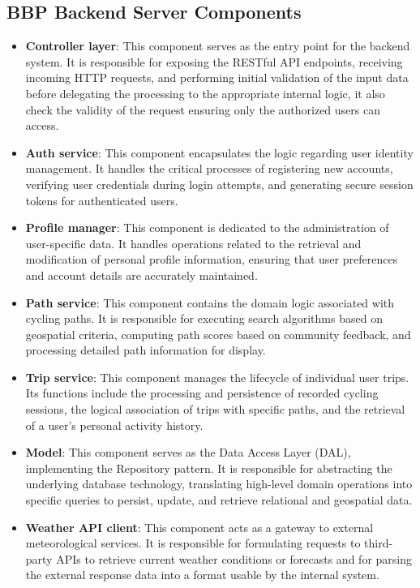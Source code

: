 \subsection{BBP Backend Server Components}

\begin{itemize}
    \item \textbf{Controller layer}: This component serves as the entry point for the backend system. It is responsible for exposing the RESTful API endpoints, receiving incoming HTTP requests, and performing initial validation of the input data before delegating the processing to the appropriate internal logic, it also check the validity of the request ensuring only the authorized users can access.


    \item \textbf{Auth service}: This component encapsulates the logic regarding user identity management. It handles the critical processes of registering new accounts, verifying user credentials during login attempts, and generating secure session tokens for authenticated users.

    \item \textbf{Profile manager}: This component is dedicated to the administration of user-specific data. It handles operations related to the retrieval and modification of personal profile information, ensuring that user preferences and account details are accurately maintained.

    \item \textbf{Path service}: This component contains the domain logic associated with cycling paths. It is responsible for executing search algorithms based on geospatial criteria, computing path scores based on community feedback, and processing detailed path information for display.

    \item \textbf{Trip service}: This component manages the lifecycle of individual user trips. Its functions include the processing and persistence of recorded cycling sessions, the logical association of trips with specific paths, and the retrieval of a user's personal activity history.

    \item \textbf{Model}: This component serves as the Data Access Layer (DAL), implementing the Repository pattern. It is responsible for abstracting the underlying database technology, translating high-level domain operations into specific queries to persist, update, and retrieve relational and geospatial data.

    \item \textbf{Weather API client}: This component acts as a gateway to external meteorological services. It is responsible for formulating requests to third-party APIs to retrieve current weather conditions or forecasts and for parsing the external response data into a format usable by the internal system.
\end{itemize}




